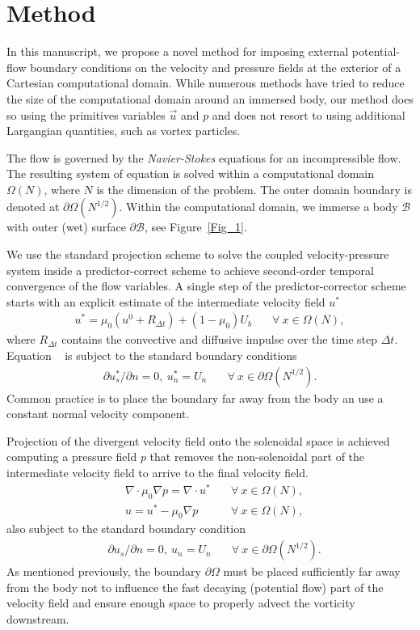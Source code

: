 \documentclass{article}
\begin{document}
\section{Method}

In this manuscript, we propose a novel method for imposing external potential-flow boundary conditions on the velocity and pressure fields at the exterior of a Cartesian computational domain. While numerous methods have tried to reduce the size of the computational domain around an immersed body, our method does so using the primitives variables $\vec u$ and $p$ and does not resort to using additional Largangian quantities, such as vortex particles.

The flow is governed by the \emph{Navier-Stokes} equations for an incompressible flow. The resulting system of equation is solved within a computational domain $\Omega(N)$, where $N$ is the dimension of the problem. The outer domain boundary is denoted at $\partial\Omega(N^{1/2})$. Within the computational domain, we immerse a body $\mathcal{B}$ with outer (wet) surface $\partial\mathcal{B}$, see Figure~\ref{Fig_1}.

We use the standard projection scheme to solve the coupled velocity-pressure system inside a predictor-correct scheme to achieve second-order temporal convergence of the flow variables. 
A single step of the predictor-corrector scheme starts with an explicit estimate of the intermediate velocity field $u^*$
\begin{align}
    u^* = \mu_0(u^0+R_{\Delta t})+(1-\mu_0)U_b &\quad\forall\ x\in\Omega (N),
\end{align}
where $R_{\Delta t}$ contains the convective and diffusive impulse over the time step $\Delta t$. Equation \theequation~ is subject to the standard boundary conditions
\begin{align}
    \partial u^*_s/\partial n = 0,\ u^*_n = U_n &\quad\forall\ x\in\partial\Omega (N^{1/2}).
\end{align}
Common practice is to place the boundary far away from the body an use a constant normal velocity component.

Projection of the divergent velocity field onto the solenoidal space is achieved computing a pressure field $p$ that removes the non-solenoidal part of the intermediate velocity field to arrive to the final velocity field.
\begin{align}
      &\nabla\cdot\mu_0\nabla p = \nabla\cdot u^* &\quad\forall\ x\in\Omega (N),\\
      &u = u^*-\mu_0\nabla p &\quad\forall\ x\in\Omega (N),
\end{align}
also subject to the standard boundary condition
\begin{align}
      &\partial u_s/\partial n = 0,\ u_n = U_n &\quad\forall\ x\in\partial\Omega (N^{1/2}).
\end{align}
As mentioned previously, the boundary $\partial\Omega$ must be placed sufficiently far away from the body not to influence the fast decaying (potential flow) part of the velocity field and ensure enough space to properly advect the vorticity downstream. 
\end{document}
